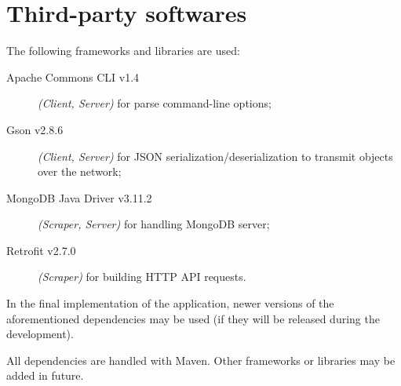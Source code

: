\section{Third-party softwares}\label{sec:dependencies}

The following frameworks and libraries are used:
\begin{description}
	\item[Apache Commons CLI v1.4] \textit{(Client, Server)} for parse
		command-line options;
	\item[Gson v2.8.6] \textit{(Client, Server)} for JSON
		serialization/deserialization to transmit objects over the
		network;
	\item[MongoDB Java Driver v3.11.2] \textit{(Scraper, Server)} for
		handling MongoDB server;
	\item[Retrofit v2.7.0] \textit{(Scraper)} for building HTTP API
		requests.
\end{description}

In the final implementation of the application, newer versions of the
aforementioned dependencies may be used (if they will be released during the
development).

All dependencies are handled with Maven. Other frameworks or libraries may be
added in future.
